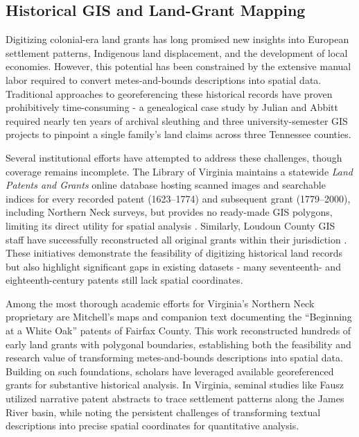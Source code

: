 \subsection{Historical GIS and Land-Grant
Mapping}\label{historical-gis-and-land-grant-mapping}

Digitizing colonial-era land grants has long promised new insights into
European settlement patterns, Indigenous land displacement, and the
development of local economies. However, this potential has been
constrained by the extensive manual labor required to convert
metes-and-bounds descriptions into spatial data. Traditional approaches
to georeferencing these historical records have proven prohibitively
time-consuming - a genealogical case study by Julian and Abbitt
\citep{Julian2014_tennessee} required nearly ten years of archival
sleuthing and three university-semester GIS projects to pinpoint a
single family's land claims across three Tennessee counties.

Several institutional efforts have attempted to address these
challenges, though coverage remains incomplete. The Library of Virginia
maintains a statewide \emph{Land Patents and Grants} online database
hosting scanned images and searchable indices for every recorded patent
(1623--1774) and subsequent grant (1779--2000), including Northern Neck
surveys, but provides no ready-made GIS polygons, limiting its direct
utility for spatial analysis \citep{lva_patents_db}. Similarly, Loudoun
County GIS staff have successfully reconstructed all original grants
within their jurisdiction \citep{loudoun_grants_dataset}. These
initiatives demonstrate the feasibility of digitizing historical land
records but also highlight significant gaps in existing datasets - many
seventeenth- and eighteenth-century patents still lack spatial
coordinates.

Among the most thorough academic efforts for Virginia's Northern Neck
proprietary are Mitchell's \citep{mitchell1977whiteoak} maps and
companion text documenting the ``Beginning at a White Oak'' patents of
Fairfax County. This work reconstructed hundreds of early land grants
with polygonal boundaries, establishing both the feasibility and
research value of transforming metes-and-bounds descriptions into
spatial data. Building on such foundations, scholars have leveraged
available georeferenced grants for substantive historical analysis. In
Virginia, seminal studies like Fausz \citep{Fausz1971_settlement}
utilized narrative patent abstracts to trace settlement patterns along
the James River basin, while noting the persistent challenges of
transforming textual descriptions into precise spatial coordinates for
quantitative analysis.

